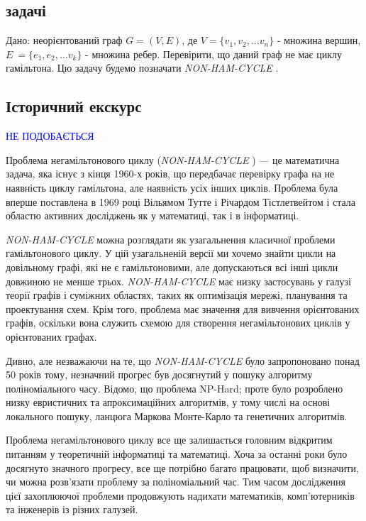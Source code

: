 \documentclass[14pt]{article}
\begin{document}
\begin{spacing}{1.175}
        \newcommand{\nonhamcycle}{\textit{NON-HAM-CYCLE }}
        \newcommand{\hamcycle}{\textit{HAM-CYCLE }}
        \newcommand{\dhampath}{\textit{D-HAM-PATH }}
        \newcommand{\tsat}{\textit{3SAT }}
        \newcommand{\bolddot}{\textbf{.}}

        
        \subsection{ задачі}
        \quad Дано: неорієнтований граф \(G = (V,E)\), де \(V = \{v_1, v_2, \dots v_n\}\) - множина вершин, \(E\ = \{e_1, e_2, \dots v_k\}\) - множина ребер. Перевірити, що даний граф не має циклу гамільтона. Цю задачу будемо позначати \nonhamcycle .    
        \subsection{\normalfont Історичний екскурс}
        \textcolor{blue}{НЕ ПОДОБАЄТЬСЯ}
        
        Проблема негамільтонового циклу (\nonhamcycle) — це математична задача, яка існує з кінця 1960-х років, що передбачає перевірку графа на не наявність циклу гамільтона, але наявність усіх інших циклів. Проблема була вперше поставлена в 1969 році Вільямом Тутте і Річардом Тістлетвейтом і стала областю активних досліджень як у математиці, так і в інформатиці.

        \nonhamcycle можна розглядати як узагальнення класичної проблеми гамільтонового циклу. У цій узагальненій версії ми хочемо знайти цикли на довільному графі, які не є гамільтоновими, але допускаються всі інші цикли довжиною не менше трьох. \nonhamcycle має низку застосувань у галузі теорії графів і суміжних областях, таких як оптимізація мережі, планування та проектування схем. Крім того, проблема має значення для вивчення орієнтованих графів, оскільки вона служить схемою для створення негамільтонових циклів у орієнтованих графах.

        Дивно, але незважаючи на те, що \nonhamcycle було запропоновано понад 50 років тому, незначний прогрес був досягнутий у пошуку алгоритму поліноміального часу. Відомо, що проблема NP-Hard; проте було розроблено низку евристичних та апроксимаційних алгоритмів, у тому числі на основі локального пошуку, ланцюга Маркова Монте-Карло та генетичних алгоритмів.

        Проблема негамільтонового циклу все ще залишається головним відкритим питанням у теоретичній інформатиці та математиці. Хоча за останні роки було досягнуто значного прогресу, все ще потрібно багато працювати, щоб визначити, чи можна розв’язати проблему за поліноміальний час. Тим часом дослідження цієї захоплюючої проблеми продовжують надихати математиків, комп’ютерників та інженерів із різних галузей.
    

\end{spacing}
\end{document}
